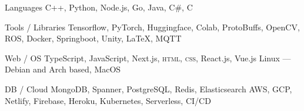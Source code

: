 

\begin{cvskills}

  \cvskill
  {Languages} %
  {C++, Python, Node.js, Go, Java, C\#, C} %

  \cvskill
  {Tools / Libraries} %
  {Tensorflow, PyTorch, Huggingface, Colab, ProtoBuffs, OpenCV, ROS, Docker, Springboot, Unity, \LaTeX, MQTT} %

  \cvskill
  {Web / OS} %
  {TypeScript, JavaScript, Next.js, \textsc{html}, \textsc{css}, React.js, Vue.js {\enskip\cdotp\enskip} Linux --- Debian and Arch based, MacOS} %

  \cvskill
  {DB / Cloud} %
  {MongoDB, Spanner, PostgreSQL, Redis, Elasticsearch {\enskip\cdotp\enskip} AWS, GCP, Netlify, Firebase, Heroku, Kubernetes, Serverless, CI/CD} %

\end{cvskills}
